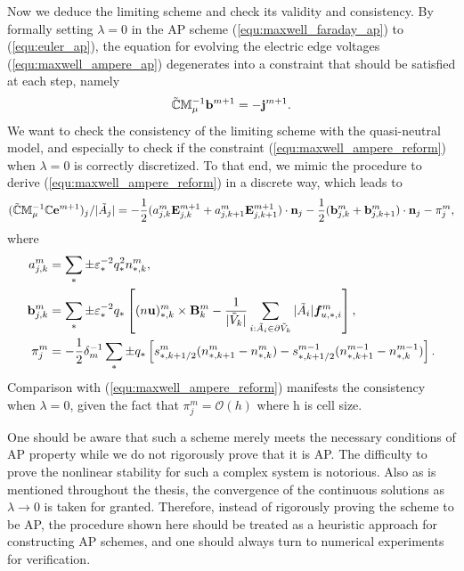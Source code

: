 \documentclass{report}
\begin{document}
Now we deduce the limiting scheme and check its validity and consistency. By formally setting $\lambda = 0$ in the AP scheme (\ref{equ:maxwell_faraday_ap}) to (\ref{equ:euler_ap}), the equation for evolving the electric edge voltages (\ref{equ:maxwell_ampere_ap}) degenerates into a constraint that should be satisfied at each step, namely
\begin{equation*}
     \Tilde{\mathbb{C}}\mathbb{M}_\mu^{-1}\mathbf{b}^{m+1} = - \mathbf{j}^{m+1}.
\end{equation*}
We want to check the consistency of the limiting scheme with the quasi-neutral model, and especially to check if the constraint (\ref{equ:maxwell_ampere_reform}) when $\lambda = 0$ is correctly discretized. To that end, we mimic the procedure to derive (\ref{equ:maxwell_ampere_reform}) in a discrete way, which leads to
\begin{equation*}
    (\Tilde{\mathbb{C}}\mathbb{M}_\mu^{-1}\mathbb{C}\mathbf{e}^{m+1})_j / |\Tilde{A}_j| = - \frac{1}{2}(a_{j,k}^m\mathbf{E}^{m+1}_{j,k} + a_{j,k+1}^m\mathbf{E}^{m+1}_{j,k+1})\cdot \mathbf{n}_j - \frac{1}{2}(\mathbf{b}_{j,k}^m + \mathbf{b}_{j, k+1}^m) \cdot \mathbf{n}_j - \pi_j^m,
\end{equation*}
where
\begin{align*}
    a_{j,k}^m &= \sum_*\pm\varepsilon_*^{-2}q_*^2n^m_{*,k}, \\
    \mathbf{b}_{j,k}^m &= \sum_*\pm\varepsilon_*^{-2}q_*\left[(n\mathbf{u})^m_{*,k}\times\mathbf{B}^m_k - \frac{1}{|\Tilde{V}_k|}\sum_{i:\Tilde{A}_i\in\partial\Tilde{V}_k}|\Tilde{A}_i|\bm{f}_{u,*,i}^m\right], \\
    \pi^m_j &= - \frac{1}{2} \delta_m^{-1} \sum_* \pm q_* \left[s_{*,k+1/2}^m(n^m_{*,k+1} - n^m_{*,k}) - s^{m-1}_{*,k+1/2}(n^{m-1}_{*,k+1} - n^{m-1}_{*,k})\right].
\end{align*}
Comparison with (\ref{equ:maxwell_ampere_reform}) manifests the consistency when $\lambda = 0$, given the fact that $\pi^m_j = \mathcal{O}(h)$ where h is cell size.

One should be aware that such a scheme merely meets the necessary conditions of AP property while we do not rigorously prove that it is AP. The difficulty to prove the nonlinear stability for such a complex system is notorious. Also as is mentioned throughout the thesis, the convergence of the continuous solutions as $\lambda \rightarrow 0$ is taken for granted. Therefore, instead of rigorously proving the scheme to be AP, the procedure shown here should be treated as a heuristic approach for constructing AP schemes, and one should always turn to numerical experiments for verification. 
\end{document}
